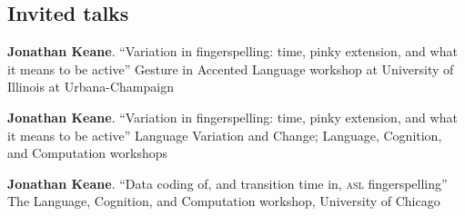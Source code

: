 \documentclass[10pt, letterpaper]{article}
\newcommand{\years}[1]{\marginpar{\scriptsize #1}}
\begin{document}
\vspace{2ex}
\subsection*{Invited talks}
\begin{hangparas}{1em}{1}
\-\years{2014}\textbf{Jonathan Keane}. ``Variation in fingerspelling: time, pinky extension, and what it means to be active'' Gesture in Accented Language workshop at University of Illinois at Urbana-Champaign
                                     
\-\years{2013}\textbf{Jonathan Keane}. ``Variation in fingerspelling: time, pinky extension, and what it means to be active'' Language Variation and Change; Language, Cognition, and Computation workshops
                                     
\-\years{2011}\textbf{Jonathan Keane}. ``Data coding of, and transition time in, {\textsc{asl}} fingerspelling'' The Language, Cognition, and Computation workshop, University of Chicago

\end{hangparas}
         
\vspace{2ex}
\end{document}
